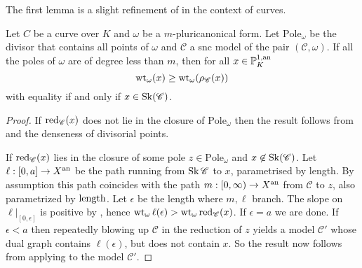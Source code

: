 	The first lemma is a slight refinement of \cite[prop.\ 4.4.4]{mustataWeightFunctionsNonArchimedean2015} in the context of curves.
	\begin{lemma}\label{lem:well_behaved_pole_weight}
	Let $C$ be a curve over $K$ and $\omega$ be a $m$-pluricanonical form.
	Let $\mathrm{Pole}_\omega$ be the divisor that contains all points of $\omega$ and $\mathscr C$ a snc model of the pair $(\mathscr C, \omega)$.  
	If all the poles of $\omega$ are of degree less than $m$, then for all $x \in \mathbb{P}^{1, \text{an}}_K$ \[
		\operatorname{wt}_\omega(x) \ge \operatorname{wt}_\omega(\rho_{\mathscr C}(x))
	\] 
	with equality if and only if $x \in \operatorname{Sk}(\mathscr C)$. 
\end{lemma}
\begin{proof}
	If $\operatorname{red}_{\mathscr C}(x)$ does not lie in the closure of $\mathrm{Pole}_\omega$ then the result follows from \cite[prop.\ 4.4.4.(2)]{mustataWeightFunctionsNonArchimedean2015} and the denseness of divisorial points. 

	If $\operatorname{red}_{\mathscr C}(x)$ lies in the closure of some pole $z \in \mathrm{Pole}_\omega$ and $x \not\in \operatorname{Sk}(\mathscr C)$. 
	Let $\ell: [0, a] \to X{}^{\text{an}}$ be the path running from $\operatorname{Sk} \mathscr C$ to $x$, parametrised by length. 
	By assumption this path coincides with the path $m: [0, \infty) \to X{}^{\text{an}}$ from $\mathscr C$ to $z$, also parametrized by $\operatorname{length}$.
	Let $\epsilon$ be the length where $m, \ell$ branch. 
	The slope on  $\ell|_{[0, \epsilon]}$ is positive by \cite[thm.\ 3.2.3.(2)]{bakerWeightFunctionsBerkovich2016} , hence $\operatorname{wt}_\omega \ell(\epsilon) > \operatorname{wt}_\omega \operatorname{red}_{\mathscr C}(x)$.
	If $\epsilon = a$ we are done. 
	If $\epsilon < a$ then repeatedly blowing up $\mathscr C$ in the reduction of $z$ yields a model $\mathscr C'$ whose dual graph contains $\ell(\epsilon)$, but does not contain $x$.
	So the result now follows from applying \cite[prop.\ 4.4.4.(2)]{mustataWeightFunctionsNonArchimedean2015} to the model $\mathscr C'$. 
\end{proof}

